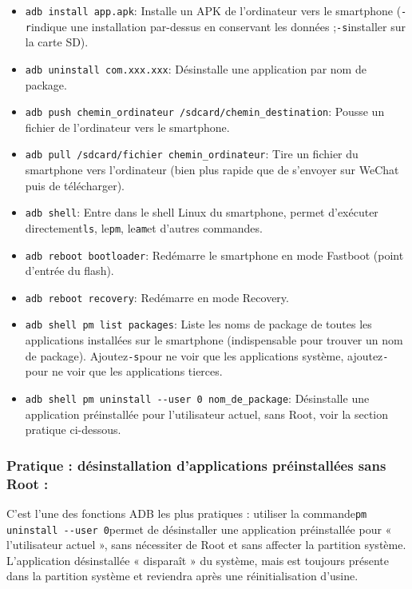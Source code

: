 \begin{itemize}
  \item \texttt{adb install app.\allowbreak apk}: Installe un APK de l'ordinateur vers le smartphone (\texttt{-\allowbreak r}indique une installation par-dessus en conservant les données ;\texttt{-\allowbreak s}installer sur la carte SD).
  \item \texttt{adb uninstall com.\allowbreak xxx.\allowbreak xxx}: Désinstalle une application par nom de package.
  \item \texttt{adb push chemin\_ordinateur /\allowbreak sdcard/\allowbreak chemin\_destination}: Pousse un fichier de l'ordinateur vers le smartphone.
  \item \texttt{adb pull /\allowbreak sdcard/\allowbreak fichier chemin\_ordinateur}: Tire un fichier du smartphone vers l'ordinateur (bien plus rapide que de s'envoyer sur WeChat puis de télécharger).
  \item \texttt{adb shell}: Entre dans le shell Linux du smartphone, permet d'exécuter directement\texttt{ls}, le\texttt{pm}, le\texttt{am}et d'autres commandes.
  \item \texttt{adb reboot bootloader}: Redémarre le smartphone en mode Fastboot (point d'entrée du flash).
  \item \texttt{adb reboot recovery}: Redémarre en mode Recovery.
  \item \texttt{adb shell pm list packages}: Liste les noms de package de toutes les applications installées sur le smartphone (indispensable pour trouver un nom de package). Ajoutez\texttt{-\allowbreak s}pour ne voir que les applications système, ajoutez\texttt{-}pour ne voir que les applications tierces.
  \item \texttt{adb shell pm uninstall -\allowbreak -\allowbreak user 0 nom\_de\_package}: Désinstalle une application préinstallée pour l'utilisateur actuel, sans Root, voir la section pratique ci-dessous.
\end{itemize}

\subsubsection*{Pratique : désinstallation d'applications préinstallées sans Root :}

C'est l'une des fonctions ADB les plus pratiques : utiliser la commande\texttt{pm uninstall -\allowbreak -\allowbreak user 0}permet de désinstaller une application préinstallée pour « l'utilisateur actuel », sans nécessiter de Root et sans affecter la partition système. L'application désinstallée « disparaît » du système, mais est toujours présente dans la partition système et reviendra après une réinitialisation d'usine.

